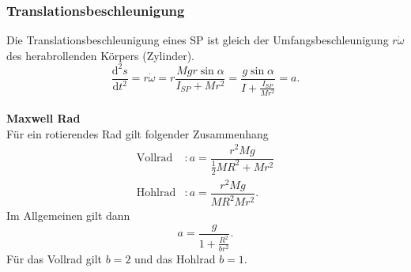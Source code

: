 \documentclass[a4paper,12pt]{article}
\begin{document}
\subsubsection{Translationsbeschleunigung}
Die Translationsbeschleunigung eines SP ist gleich der Umfangsbeschleunigung $r\dot{\omega }$ des herabrollenden Körpers (Zylinder).
\[ 
        \dfrac{\text{d}^2s}{\text{d}t^2}=r\dot{\omega }=r\dfrac{Mgr\sin \alpha }{I_{SP}+Mr^2}=\dfrac{g\sin \alpha }{I+\tfrac{I_{SP}}{Mr^2}}=a
.\] 
\hfill\\\textbf{Maxwell Rad}\\ 
Für ein rotierendes Rad gilt folgender Zusammenhang
\begin{align*}
        \text{Vollrad}&:a=\dfrac{r^2Mg}{\tfrac{1}{2}MR^2+Mr^2}\\
        \text{Hohlrad}&:a=\dfrac{r^2Mg}{MR^2Mr^2}
.\end{align*}
Im Allgemeinen gilt dann
\[ 
        a=\dfrac{g}{1+\tfrac{R^2}{br^2}}
.\] 
Für das Vollrad gilt $b=2$ und das Hohlrad $b=1$.
\end{document}
